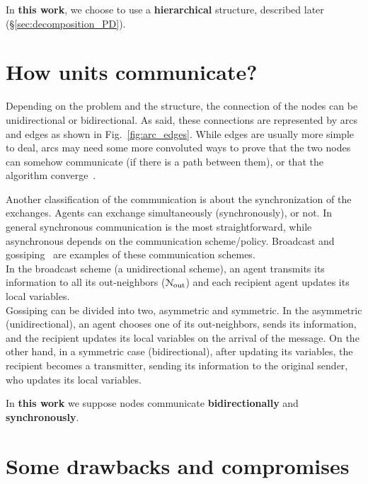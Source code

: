 \documentclass[../main.tex]{subfiles}
\begin{document}
In \textbf{this work}, we choose to use a \textbf{hierarchical} structure, described later (\S\ref{sec:decomposition_PD}).

\section{How units communicate?}
Depending on the problem and the structure, the connection of the nodes can be unidirectional or bidirectional. As said, these connections are represented by arcs and edges as shown in Fig.~\ref{fig:arc_edges}.
While edges are usually more simple to deal, arcs may need some more convoluted ways to prove that the two nodes can somehow communicate (if there is a path between them), or that the algorithm converge~\cite{GarinSchenato2010}.

Another classification of the communication is about the synchronization of the exchanges. Agents can exchange simultaneously (synchronously), or not. In general synchronous communication is the most straightforward, while asynchronous depends on the communication scheme/policy. Broadcast and gossiping~\cite{GarinSchenato2010} are examples of these communication schemes.
\\In the broadcast scheme (a unidirectional scheme), an agent transmits its information to all its out-neighbors ($\mathcal{N}_{\text{out}}$) and each recipient agent updates its local variables.
\\Gossiping can be divided into two, asymmetric and symmetric.
In the asymmetric (unidirectional), an agent chooses one of its out-neighbors, sends its information, and the recipient updates its local variables on the arrival of the message.
On the other hand, in a symmetric case (bidirectional), after updating its variables, the recipient becomes a transmitter, sending its information to the original sender, who updates its local variables.

In \textbf{this work} we suppose nodes communicate \textbf{bidirectionally} and \textbf{synchronously}.

\pagebreak
\section{Some drawbacks and compromises}\label{sec:drawbacks}
\end{document}

